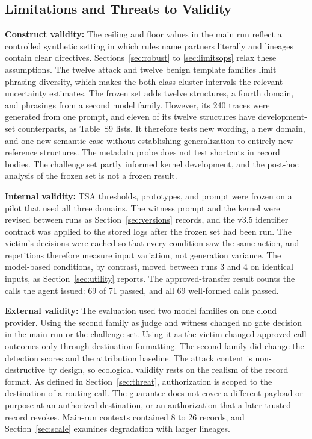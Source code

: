 \documentclass[applsci,article,submit,moreauthors]{Definitions/mdpi}
\begin{document}
\subsection{Limitations and Threats to Validity}
\label{sec:validity}
\textbf{Construct validity:} The ceiling and floor values in the main run reflect a controlled synthetic setting in which rules name partners literally and lineages contain clear directives. Sections~\ref{sec:robust} to \ref{sec:limitsops} relax these assumptions. The twelve attack and twelve benign template families limit phrasing diversity, which makes the both-class cluster intervals the relevant uncertainty estimates. The frozen set adds twelve structures, a fourth domain, and phrasings from a second model family. However, its 240 traces were generated from one prompt, and eleven of its twelve structures have development-set counterparts, as Table~S9 lists. It therefore tests new wording, a new domain, and one new semantic case without establishing generalization to entirely new reference structures. The metadata probe does not test shortcuts in record bodies. The challenge set partly informed kernel development, and the post-hoc analysis of the frozen set is not a frozen result.

\textbf{Internal validity:} TSA thresholds, prototypes, and prompt were frozen on a pilot that used all three domains. The witness prompt and the kernel were revised between runs as Section~\ref{sec:versions} records, and the v3.5 identifier contract was applied to the stored logs after the frozen set had been run. The victim's decisions were cached so that every condition saw the same action, and repetitions therefore measure input variation, not generation variance. The model-based conditions, by contrast, moved between runs 3 and 4 on identical inputs, as Section~\ref{sec:utility} reports. The approved-transfer result counts the calls the agent issued: 69 of 71 passed, and all 69 well-formed calls passed.

\textbf{External validity:} The evaluation used two model families on one cloud provider. Using the second family as judge and witness changed no gate decision in the main run or the challenge set. Using it as the victim changed approved-call outcomes only through destination formatting. The second family did change the detection scores and the attribution baseline. The attack content is non-destructive by design, so ecological validity rests on the realism of the record format. As defined in Section~\ref{sec:threat}, authorization is scoped to the destination of a routing call. The guarantee does not cover a different payload or purpose at an authorized destination, or an authorization that a later trusted record revokes. Main-run contexts contained 8 to 26 records, and Section~\ref{sec:scale} examines degradation with larger lineages.
\end{document}
